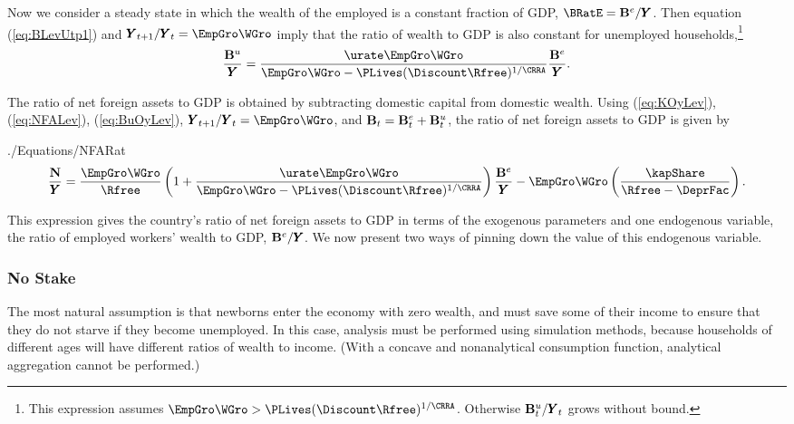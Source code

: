 \documentclass[titlepage]{\econtex}\newcommand{\texname}{cjSOE}
\renewcommand{\GDPLev}{\ensuremath{\pmb{Y}}}
\begin{document}
\hypertarget{BuOyLev}{}

Now we consider a steady state in which the wealth of the employed is a constant fraction of GDP, $\BRatE = \BLevE /\GDPLev$. Then equation (\ref{eq:BLevUtp1}) and $\GDPLev_{t+1}/\GDPLev_t=\EmpGro \WGro$  imply that the ratio of wealth to GDP is also constant for unemployed households,\footnote{This expression assumes $\EmpGro \WGro >\PLives(\Discount \Rfree )^{1/\CRRA}$. Otherwise $\BLevU_{t} / \GDPLev_t$ grows without bound.}
\begin{equation}
\frac{\BLevU}{\GDPLev}= \frac{\urate \EmpGro \WGro}{\EmpGro \WGro -\PLives(\Discount \Rfree )^{1/\CRRA}} \frac{\BLevE}{\GDPLev}.
\label{eq:BuOyLev}
\end{equation}



The ratio of net foreign assets to GDP is obtained by subtracting domestic capital from domestic wealth. Using (\ref{eq:KOyLev}), (\ref{eq:NFALev}), (\ref{eq:BuOyLev}), $\GDPLev_{t+1}/\GDPLev_t=\EmpGro \WGro$, and $\mathbf{B}_t=\mathbf{B}^{e}_t+\mathbf{B}^{u}_{t}$, the ratio of net foreign assets to GDP is given by
\begin{verbatimwrite}{./Equations/NFARat}
\begin{equation}
\frac{\NFALev}{\GDPLev}= \frac{\EmpGro \WGro}{\Rfree} \left( 1 + \frac{\urate \EmpGro \WGro}{\EmpGro \WGro -\PLives(\Discount \Rfree )^{1/\CRRA}} \right) \frac{\BLevE}{\GDPLev} -\EmpGro \WGro\left( \frac{\kapShare}{\Rfree-\DeprFac}\right).
\label{eq:NFARat}
\end{equation}
\end{verbatimwrite}

This expression gives the country's ratio of net foreign assets to GDP in terms of the exogenous parameters and one endogenous variable, the ratio of employed workers' wealth to GDP, $\BLevE/\GDPLev$. We now present two ways of pinning down the value of this endogenous variable.


\subsubsection{No Stake}

The most natural assumption is that newborns enter the economy with zero wealth, and must save some of their income to ensure that they do not starve
if they become unemployed.
In this case, analysis must be performed using simulation methods, because households of different ages will have different ratios of wealth to income.  (With a concave and nonanalytical consumption function, analytical aggregation cannot be performed.)
\end{document}
